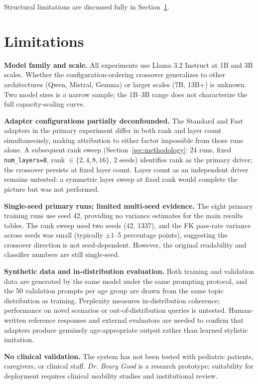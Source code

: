 \documentclass[journal]{IEEEtai}
\begin{document}
Structural limitations are discussed fully in Section~\ref{sec:limitations}.

\section{Limitations}\label{sec:limitations}

\textbf{Model family and scale.} All experiments use Llama 3.2 Instruct at 1B and 3B scales. Whether the configuration-ordering crossover generalizes to other architectures (Qwen, Mistral, Gemma) or larger scales (7B, 13B+) is unknown. Two model sizes is a narrow sample; the 1B--3B range does not characterize the full capacity-scaling curve.

\textbf{Adapter configurations partially deconfounded.} The Standard and Fast adapters in the primary experiment differ in both rank and layer count simultaneously, making attribution to either factor impossible from those runs alone. A subsequent rank sweep (Section~\ref{sec:methodology}: 24 runs, fixed \texttt{num\_layers=8}, rank $\in \{2,4,8,16\}$, 2 seeds) identifies rank as the primary driver; the crossover persists at fixed layer count. Layer count as an independent driver remains untested: a symmetric layer sweep at fixed rank would complete the picture but was not performed.

\textbf{Single-seed primary runs; limited multi-seed evidence.} The eight primary training runs use seed 42, providing no variance estimates for the main results tables. The rank sweep used two seeds (42, 1337), and the FK pass-rate variance across seeds was small (typically $\pm 1$--5 percentage points), suggesting the crossover direction is not seed-dependent. However, the original readability and classifier numbers are still single-seed.

\textbf{Synthetic data and in-distribution evaluation.} Both training and validation data are generated by the same model under the same prompting protocol, and the 50 validation prompts per age group are drawn from the same topic distribution as training. Perplexity measures in-distribution coherence; performance on novel scenarios or out-of-distribution queries is untested. Human-written reference responses and external evaluators are needed to confirm that adapters produce genuinely age-appropriate output rather than learned stylistic imitation.

\textbf{No clinical validation.} The system has not been tested with pediatric patients, caregivers, or clinical staff. \textit{Dr. Beary Good} is a research prototype; suitability for deployment requires clinical usability studies and institutional review.
\end{document}
